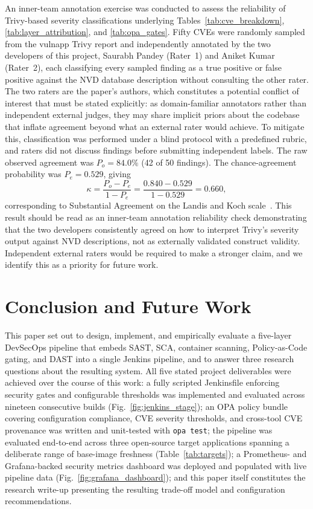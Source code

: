 \documentclass[conference]{IEEEtran}
\begin{document}
An inner-team annotation exercise was conducted to assess the reliability of Trivy-based severity classifications underlying Tables~\ref{tab:cve_breakdown}, \ref{tab:layer_attribution}, and \ref{tab:opa_gates}. Fifty CVEs were randomly sampled from the vulnapp Trivy report and independently annotated by the two developers of this project, Saurabh Pandey (Rater~1) and Aniket Kumar (Rater~2), each classifying every sampled finding as a true positive or false positive against the NVD database description without consulting the other rater. The two raters are the paper's authors, which constitutes a potential conflict of interest that must be stated explicitly: as domain-familiar annotators rather than independent external judges, they may share implicit priors about the codebase that inflate agreement beyond what an external rater would achieve. To mitigate this, classification was performed under a blind protocol with a predefined rubric, and raters did not discuss findings before submitting independent labels. The raw observed agreement was $P_o = 84.0\%$ (42 of 50 findings). The chance-agreement probability was $P_e = 0.529$, giving
\begin{equation}
\kappa = \frac{P_o - P_e}{1 - P_e} = \frac{0.840 - 0.529}{1 - 0.529} = 0.660,
\label{eq:kappa}
\end{equation}
corresponding to Substantial Agreement on the Landis and Koch scale~\cite{ref12}. This result should be read as an inner-team annotation reliability check demonstrating that the two developers consistently agreed on how to interpret Trivy's severity output against NVD descriptions, not as externally validated construct validity. Independent external raters would be required to make a stronger claim, and we identify this as a priority for future work.

\section{Conclusion and Future Work}
\label{sec:conclusion}

This paper set out to design, implement, and empirically evaluate a five-layer DevSecOps pipeline that embeds SAST, SCA, container scanning, Policy-as-Code gating, and DAST into a single Jenkins pipeline, and to answer three research questions about the resulting system. All five stated project deliverables were achieved over the course of this work: a fully scripted Jenkinsfile enforcing security gates and configurable thresholds was implemented and evaluated across nineteen consecutive builds (Fig.~\ref{fig:jenkins_stage}); an OPA policy bundle covering configuration compliance, CVE severity thresholds, and cross-tool CVE provenance was written and unit-tested with \texttt{opa test}; the pipeline was evaluated end-to-end across three open-source target applications spanning a deliberate range of base-image freshness (Table~\ref{tab:targets}); a Prometheus- and Grafana-backed security metrics dashboard was deployed and populated with live pipeline data (Fig.~\ref{fig:grafana_dashboard}); and this paper itself constitutes the research write-up presenting the resulting trade-off model and configuration recommendations.
\end{document}
